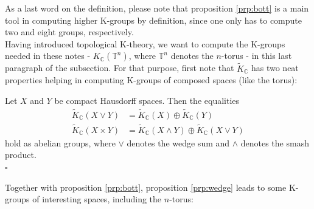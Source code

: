 As a last word on the definition, please note that proposition \ref{prp:bott} is a main tool in computing higher K-groups by definition, since one only has to compute two and eight groups, respectively.
\\
Having introduced topological K-theory, we want to compute the K-groups needed in these notes - $K_{\mathbb{C}}(\mathbb{T}^{n})$, where $\mathbb{T}^{n}$ denotes the $n$-torus - in this last paragraph of the subsection.
For that purpose, first note that $\tilde{K}_{\mathbb{C}}$ has two neat properties helping in computing K-groups of composed spaces (like the torus):
\\
\begin{prp}
\label{prp:wedge}
Let $X$ and $Y$ be compact Hausdorff spaces.
Then the equalities
\begin{align*}
  \tilde{K}_{\mathbb{C}}(X \vee Y)
  &=
  \tilde{K}_{\mathbb{C}}(X)
  \oplus
  \tilde{K}_{\mathbb{C}}(Y)
  \\
  \tilde{K}_{\mathbb{C}}(X \times Y)
  &=
  \tilde{K}_{\mathbb{C}}(X \wedge Y)
  \oplus
  \tilde{K}_{\mathbb{C}}(X \vee Y)
\end{align*}
hold as abelian groups, where $\vee$ denotes the wedge sum and $\wedge$ denotes the smash product.
\\
\phantom{proven}
\hfill
$\square$
\end{prp}
Together with proposition \ref{prp:bott}, proposition \ref{prp:wedge} leads to some K-groups of interesting spaces, including the $n$-torus:
\\
